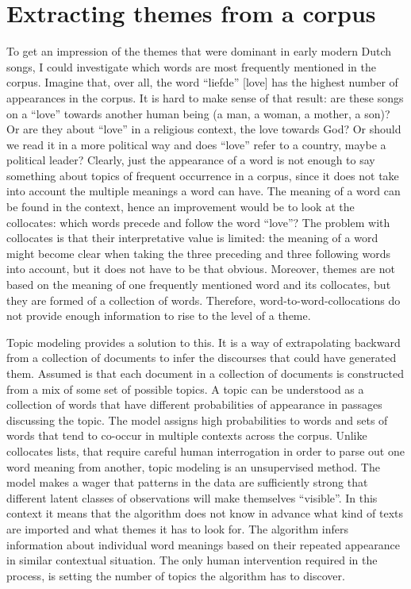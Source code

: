 \section{Extracting themes from a corpus}
To get an impression of the themes that were dominant in early modern Dutch songs, I could investigate which words are most frequently mentioned in the corpus. Imagine that, over all, the word \enquote{liefde} [love] has the highest number of appearances in the corpus. It is hard to make sense of that result: are these songs on a \enquote{love} towards another human being (a man, a woman, a mother, a son)? Or are they about \enquote{love} in a religious context, the love towards God? Or should we read it in a more political way and does \enquote{love} refer to a country, maybe a political leader? Clearly, just the appearance of a word is not enough to say something about topics of frequent occurrence in a corpus, since it does not take into account the multiple meanings a word can have. The meaning of a word can be found in the context, hence an improvement would be to look at the collocates: which words precede and follow the word \enquote{love}? The problem with collocates is that their interpretative value is limited: the meaning of a word might become clear when taking the three preceding and three following words into account, but it does not have to be that obvious. Moreover, themes are not based on the meaning of one frequently mentioned word and its collocates, but they are formed of a collection of words. Therefore, word-to-word-collocations do not provide enough information to rise to the level of a theme.\autocite[122]{jockers_macroanalysis_2013}

Topic modeling provides a solution to this. It is a way of extrapolating backward from a collection of documents to infer the discourses that could have generated them. Assumed is that each document in a collection of documents is constructed from a mix of some set of possible topics. A topic can be understood as a collection of words that have different probabilities of appearance in passages discussing the topic. The model assigns high probabilities to words and sets of words that tend to co-occur in multiple contexts across the corpus. Unlike collocates lists, that require careful human interrogation in order to parse out one word meaning from another, topic modeling is an unsupervised method. The model makes a wager that patterns in the data are sufficiently strong that different latent classes of observations will make themselves \enquote{visible}.\autocite[267]{karsdorp_humanities_2019} In this context it means that the algorithm does not know in advance what kind of texts are imported and what themes it has to look for. The algorithm infers information about individual word meanings based on their repeated appearance in similar contextual situation. The only human intervention required in the process, is setting the number of topics the algorithm has to discover. \autocites[123-124]{jockers_macroanalysis_2013}{underwood_topic_2012}

